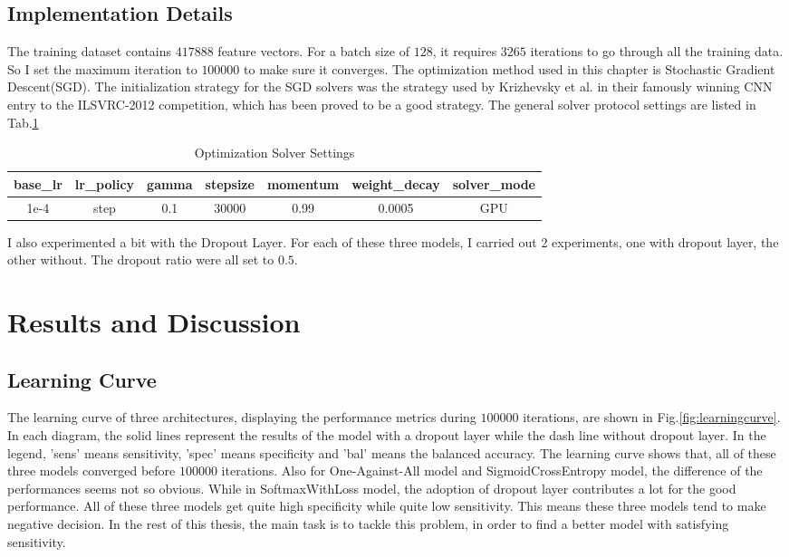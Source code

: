 \subsection{Implementation Details}
The training dataset contains  $417888$ feature vectors. For a batch size of $128$, it requires $3265$ iterations to go through all the training data.  So I set the maximum iteration to $100000$ to make sure it converges. The optimization method used in this chapter is Stochastic Gradient Descent(SGD). The initialization strategy for the SGD solvers was the strategy used by Krizhevsky et al. \cite{krizhevsky2012imagenet} in their famously winning CNN entry to the ILSVRC-2012 competition, which has been proved to be a good strategy. The general solver protocol settings are listed in Tab.\ref{tab:solversetting}
\begin{table}[h!]
	\centering
	\begin{tabular}{|c|c|c|c|c|c|c|}
		\hline base\_lr & lr\_policy & gamma & stepsize & momentum & weight\_decay & solver\_mode \\ 
		\hline 1e-4 & step & 0.1 & 30000 & 0.99 & 0.0005  & GPU \\ 
		\hline 
	\end{tabular} 
	\label{tab:solversetting}
	\caption{Optimization Solver Settings}
\end{table}
I also experimented a bit with the Dropout Layer. For each of these three models, I carried out 2 experiments, one with dropout layer, the other without. The dropout ratio were all set to $0.5$.
\section{Results and Discussion}
\subsection{Learning Curve}
The learning curve of three architectures, displaying the performance metrics during $100000$ iterations, are shown in Fig.\ref{fig:learningcurve}. In each  diagram, the solid lines represent the results of the model with a dropout layer while the dash line without dropout layer. In the legend, 'sens' means sensitivity, 'spec' means specificity and 'bal' means the balanced accuracy.
The learning curve shows that, all of these three models converged before $100000$ iterations. Also for One-Against-All model and SigmoidCrossEntropy model, the difference of the performances seems not so obvious. While in SoftmaxWithLoss model, the adoption of dropout layer contributes a lot for the good performance.
All of these three models get quite high specificity while quite low sensitivity. This means these three models tend to make negative decision. In the rest of this thesis, the main task is to tackle this problem, in order to find a better model with satisfying sensitivity. 

